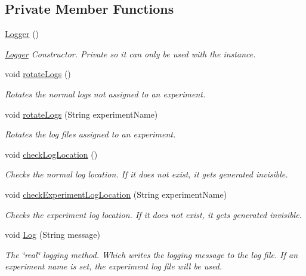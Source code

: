\subsection*{Private Member Functions}
\begin{DoxyCompactItemize}
\item 
\hyperlink{class_web_analyzer_1_1_util_1_1_logger_aa8818c2a85be10d6ba6df1b6bdc7761c}{Logger} ()
\begin{DoxyCompactList}\small\item\em \hyperlink{class_web_analyzer_1_1_util_1_1_logger}{Logger} Constructor. Private so it can only be used with the instance. \end{DoxyCompactList}\item 
void \hyperlink{class_web_analyzer_1_1_util_1_1_logger_a468f8bcd52d2597c66ab1ca6a3a26147}{rotate\+Logs} ()
\begin{DoxyCompactList}\small\item\em Rotates the normal logs not assigned to an experiment. \end{DoxyCompactList}\item 
void \hyperlink{class_web_analyzer_1_1_util_1_1_logger_a834e07e3258fe8ff3b1a8b7a3c361862}{rotate\+Logs} (String experiment\+Name)
\begin{DoxyCompactList}\small\item\em Rotates the log files assigned to an experiment. \end{DoxyCompactList}\item 
void \hyperlink{class_web_analyzer_1_1_util_1_1_logger_a2c1e81bccf2002bf43528787198f7c93}{check\+Log\+Location} ()
\begin{DoxyCompactList}\small\item\em Checks the normal log location. If it does not exist, it gets generated invisible. \end{DoxyCompactList}\item 
void \hyperlink{class_web_analyzer_1_1_util_1_1_logger_aa043e76883528fa0010f6809be07426a}{check\+Experiment\+Log\+Location} (String experiment\+Name)
\begin{DoxyCompactList}\small\item\em Checks the experiment log location. If it does not exist, it gets generated invisible. \end{DoxyCompactList}\item 
void \hyperlink{class_web_analyzer_1_1_util_1_1_logger_a8330043b579da4a0112b4694b634516f}{Log} (String message)
\begin{DoxyCompactList}\small\item\em The \char`\"{}real\char`\"{} logging method. Which writes the logging message to the log file. If an experiment name is set, the experiment log file will be used. \end{DoxyCompactList}\item 

\end{DoxyCompactItemize}
